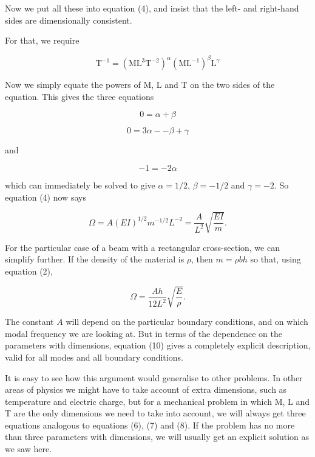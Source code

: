   Now we put all these into equation (4), and insist that the left- and 
  right-hand sides are dimensionally consistent. 

  For that, we require 

  \begin{equation*}\mathrm{T}^{-1} = (\mathrm{M} \mathrm{L}^3 
  \mathrm{T}^{-2})^\alpha (\mathrm{M} \mathrm{L}^{-1})^\beta \mathrm{L}^\gamma 
  \tag{5}\end{equation*} 

  Now we simply equate the powers of M, L and T on the two sides of the 
  equation. This gives the three equations 

  \begin{equation*}0=\alpha + \beta \tag{6}\end{equation*} 

  \begin{equation*}0 = 3 \alpha -- \beta + \gamma \tag{7}\end{equation*} 

  \noindent{}and 

  \begin{equation*}-1=-2 \alpha \tag{8}\end{equation*} 

  \noindent{}which can immediately be solved to give $\alpha = 1/2$, $\beta = 
  -1/2$ and $\gamma= -2$. So equation (4) now says 

  \begin{equation*}\Omega=A (EI)^{1/2} m^{-1/2} L^{-2} = \dfrac{A}{L^2} 
  \sqrt{\dfrac{EI}{m}} . \tag{9}\end{equation*} 

  For the particular case of a beam with a rectangular cross-section, we can 
  simplify further. If the density of the material is $\rho$, then $m=\rho b h$ 
  so that, using equation (2), 

  \begin{equation*}\Omega= \dfrac{Ah}{12 L^2} \sqrt{\dfrac{E}{\rho}} . 
  \tag{10}\end{equation*} 

  The constant $A$ will depend on the particular boundary conditions, and on 
  which modal frequency we are looking at. But in terms of the dependence on 
  the parameters with dimensions, equation (10) gives a completely explicit 
  description, valid for all modes and all boundary conditions. 

  It is easy to see how this argument would generalise to other problems. In 
  other areas of physics we might have to take account of extra dimensions, 
  such as temperature and electric charge, but for a mechanical problem in 
  which M, L and T are the only dimensions we need to take into account, we 
  will always get three equations analogous to equations (6), (7) and (8). If 
  the problem has no more than three parameters with dimensions, we will 
  usually get an explicit solution as we saw here. 

